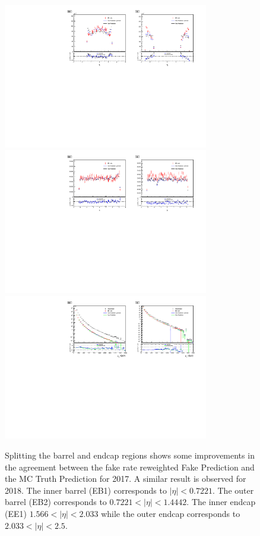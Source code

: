 \begin{figure}[!htbp]
\centering
\caption{Splitting the barrel and endcap regions shows some improvements in the agreement between the fake rate reweighted Fake Prediction and the MC Truth Prediction for 2017. A similar result is observed for 2018. The inner barrel (EB1) corresponds to $|\eta| < 0.7221$. The outer barrel (EB2) corresponds to $0.7221 < |\eta| < 1.4442$. The inner endcap (EE1) $1.566 < |\eta| < 2.033$ while the outer endcap corresponds to $2.033 < |\eta| < 2.5$.}
\includegraphics[width=0.8\textwidth]{fig/closure_test_photon_kinematics_eta_2017_withEtaBin.pdf}\\
\includegraphics[width=0.8\textwidth]{fig/closure_test_photon_kinematics_phi_2017_withEtaBin.pdf}\\
\includegraphics[width=0.8\textwidth]{fig/closure_test_photon_kinematics_pt_2017_withEtaBin.pdf}
\label{fig:EtaBinned}
\end{figure}


